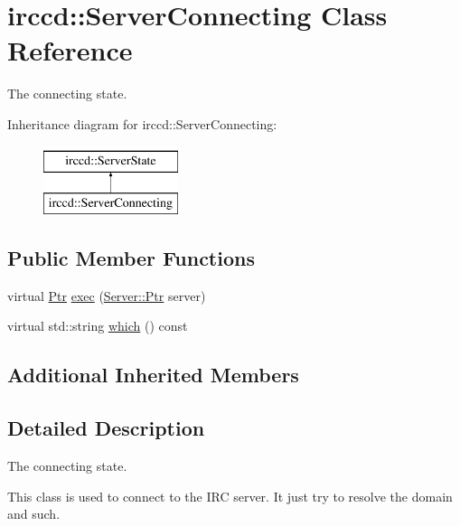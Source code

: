 \hypertarget{a00056}{\section{irccd\-:\-:Server\-Connecting Class Reference}
\label{a00056}
}


The connecting state.  


Inheritance diagram for irccd\-:\-:Server\-Connecting\-:\begin{figure}[H]
\begin{center}
\leavevmode
\includegraphics[height=2.000000cm]{a00056}
\end{center}
\end{figure}
\subsection*{Public Member Functions}
\begin{DoxyCompactItemize}
\item 
virtual \hyperlink{a00060_aa1d1595a1abc377d310f06145103d7d3}{Ptr} \hyperlink{a00056_a9819663768a558adc283ab1e390f2942}{exec} (\hyperlink{a00055_aea3f9694df81348b909814ac6f84f874}{Server\-::\-Ptr} server)
\begin{DoxyCompactList}\small\item\em \end{DoxyCompactList}\item 
virtual std\-::string \hyperlink{a00056_a4d6cf178cd2b9791c816436219d7cc65}{which} () const 
\begin{DoxyCompactList}\small\item\em \end{DoxyCompactList}\end{DoxyCompactItemize}
\subsection*{Additional Inherited Members}


\subsection{Detailed Description}
The connecting state. 

This class is used to connect to the I\-R\-C server. It just try to resolve the domain and such. 

